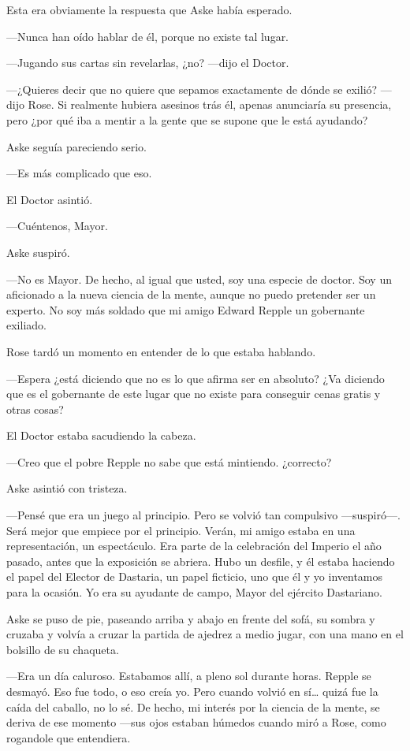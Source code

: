 {Esta era obviamente la respuesta que Aske había esperado.}

{---Nunca han oído hablar de él, porque no existe tal lugar.}

{---Jugando sus cartas sin revelarlas, ¿no? ---dijo el Doctor.}

{---¿Quieres decir que no quiere que sepamos exactamente de dónde se
	exilió? ---dijo Rose. Si realmente hubiera asesinos trás él, apenas
	anunciaría su presencia, pero ¿por qué iba a mentir a la gente que se
supone que le está ayudando?}

{Aske seguía pareciendo serio.}

{---Es más complicado que eso.}

{El Doctor asintió.}

{---Cuéntenos, Mayor.}

{Aske suspiró.}

{---No es Mayor. De hecho, al igual que usted, soy una especie de
	doctor. Soy un aficionado a la nueva ciencia de la mente, aunque no
	puedo pretender ser un experto. No soy más soldado que mi amigo Edward
Repple un gobernante exiliado.}

{Rose tardó un momento en entender de lo que estaba hablando.}

{---Espera ¿está diciendo que no es lo que afirma ser en absoluto? ¿Va
	diciendo que es el gobernante de este lugar que no existe para conseguir
cenas gratis y otras cosas?}

{El Doctor estaba sacudiendo la cabeza.}

{---Creo que el pobre Repple no sabe que está mintiendo. ¿correcto?}

{Aske asintió con tristeza.}

{---Pensé que era un juego al principio. Pero se volvió tan compulsivo
	---suspiró---. Será mejor que empiece por el principio. Verán, mi amigo
	estaba en una representación, un espectáculo. Era parte de la
	celebración del Imperio el año pasado, antes que la exposición se
	abriera. Hubo un desfile, y él estaba haciendo el papel del Elector de
	Dastaria, un papel ficticio, uno que él y yo inventamos para la ocasión.
Yo era su ayudante de campo, Mayor del ejército Dastariano.}

{Aske se puso de pie, paseando arriba y abajo en frente del sofá, su
	sombra y cruzaba y volvía a cruzar la partida de ajedrez a medio jugar,
con una mano en el bolsillo de su chaqueta.}

{---Era un día caluroso. Estabamos allí, a pleno sol durante horas.
	Repple se desmayó. Eso fue todo, o eso creía yo. Pero cuando volvió en
	sí\ldots{} quizá fue la caída del caballo, no lo sé. De hecho, mi
	interés por la ciencia de la mente, se deriva de ese momento ---sus ojos
estaban húmedos cuando miró a Rose, como rogandole que entendiera.}

